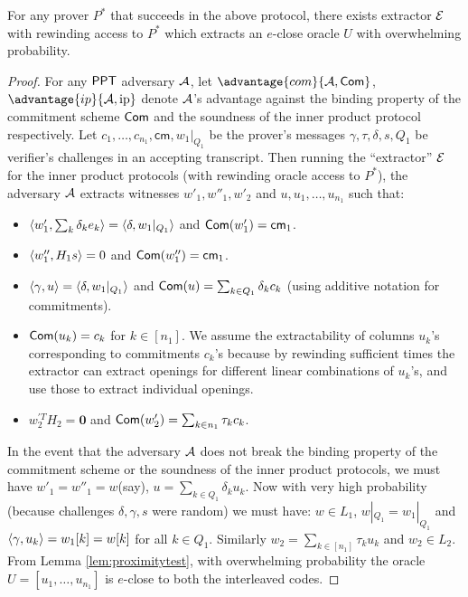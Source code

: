 \begin{lemma}\label{lem:soundbic}
For any prover $P^\ast$ that succeeds in the above protocol, there exists
extractor $\mathcal{E}$ with rewinding access to $P^\ast$ which extracts an
$e$-close oracle $U$ with overwhelming probability.
\end{lemma}
\begin{proof}
For any $\mathsf{PPT}$ adversary $\mathcal{A}$, let $\advantage{com}{\adv,\comm}$,
$\advantage{ip}{\adv,{\rm ip}}$ denote $\mathcal{A}$'s advantage against the
binding property of the commitment scheme $\mathsf{Com}$ and the soundness of the
inner product protocol respectively. Let
$c_1,\ldots,c_{n_1},\mathsf{cm},w_1|_{Q_1}$ be the prover's messages
$\gamma,\tau,\delta,s,Q_1$ be verifier's challenges in an accepting transcript.
Then running the ``extractor'' $\mathcal{E}$ for the inner product protocols (with
rewinding oracle access to $P^\ast$), the adversary $\mathcal{A}$ extracts witnesses
$w'_1,w''_1,w'_2$ and $u,u_1,\ldots,u_{n_1}$ such that:

\begin{itemize}
\item $\langle w'_1,\sum_k\delta_ke_k\rangle=\langle \delta,w_1|_{Q_1}\rangle$ and
$\mathsf{Com}(w'_1)=\mathsf{cm}_1$.
\item $\langle w''_1,H_1s\rangle=0$ and $\mathsf{Com}(w''_1)=\mathsf{cm}_1$.
\item $\langle \gamma,u\rangle=\langle \delta,w_1|_{Q_1}\rangle$ and $\mathsf{Com}(u)=\sum_{k\in
Q_1}\delta_kc_k$ (using additive notation for commitments).
\item $\mathsf{Com}(u_k)=c_k$ for $k\in [n_1]$. We assume the extractability of
columns $u_k$'s corresponding to commitments $c_k$'s because by rewinding
sufficient times the extractor can extract openings for different linear
combinations of $u_k$'s, and use those to extract individual openings.
\item $w^{'T}_2H_2 = \bm{0}$ and $\mathsf{Com}(w'_2)=\sum_{k\in n_1}\tau_kc_k$.
\end{itemize}
In the event that the adversary $\mathcal{A}$ does not break the binding property of
the commitment scheme or the soundness of the inner product protocols, we must
have $w'_1=w''_1=w$(say), $u=\sum_{k\in Q_1} \delta_ku_k$. Now with very high
probability (because challenges $\delta,\gamma,s$ were random) we must have:
$w\in L_1$, $w|_{Q_1}=w_1|_{Q_1}$ and $\langle \gamma,u_k\rangle=w_1[k]=w[k]$ for all
$k\in Q_1$. Similarly $w_2=\sum_{k\in [n_1]}\tau_ku_k$ and $w_2\in L_2$. From
Lemma \ref{lem:proximitytest}, with overwhelming probability the oracle
$U=[u_1,\ldots,u_{n_1}]$ is $e$-close to both the interleaved codes.  
\end{proof}

